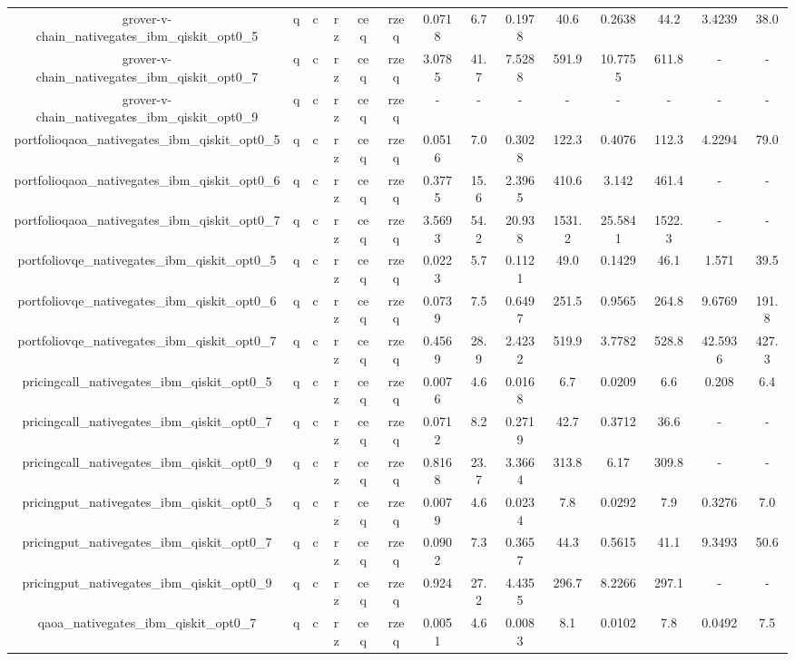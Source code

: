 \begin{table}[htb]
{\begin{tabular}{|c|c|c|c|c|c|c|c|c|c|c|c|c|c|}
grover-v-chain_nativegates_ibm_qiskit_opt0_5 & q & c & rz & ceq & rzeq & 0.0718 & 6.7 & 0.1978 & 40.6 & 0.2638 & 44.2 & 3.4239 & 38.0 \\ 
grover-v-chain_nativegates_ibm_qiskit_opt0_7 & q & c & rz & ceq & rzeq & 3.0785 & 41.7 & 7.5288 & 591.9 & 10.7755 & 611.8 & - & - \\ 
grover-v-chain_nativegates_ibm_qiskit_opt0_9 & q & c & rz & ceq & rzeq & - & - & - & - & - & - & - & - \\ 
portfolioqaoa_nativegates_ibm_qiskit_opt0_5 & q & c & rz & ceq & rzeq & 0.0516 & 7.0 & 0.3028 & 122.3 & 0.4076 & 112.3 & 4.2294 & 79.0 \\ 
portfolioqaoa_nativegates_ibm_qiskit_opt0_6 & q & c & rz & ceq & rzeq & 0.3775 & 15.6 & 2.3965 & 410.6 & 3.142 & 461.4 & - & - \\ 
portfolioqaoa_nativegates_ibm_qiskit_opt0_7 & q & c & rz & ceq & rzeq & 3.5693 & 54.2 & 20.938 & 1531.2 & 25.5841 & 1522.3 & - & - \\ 
portfoliovqe_nativegates_ibm_qiskit_opt0_5 & q & c & rz & ceq & rzeq & 0.0223 & 5.7 & 0.1121 & 49.0 & 0.1429 & 46.1 & 1.571 & 39.5 \\ 
portfoliovqe_nativegates_ibm_qiskit_opt0_6 & q & c & rz & ceq & rzeq & 0.0739 & 7.5 & 0.6497 & 251.5 & 0.9565 & 264.8 & 9.6769 & 191.8 \\ 
portfoliovqe_nativegates_ibm_qiskit_opt0_7 & q & c & rz & ceq & rzeq & 0.4569 & 28.9 & 2.4232 & 519.9 & 3.7782 & 528.8 & 42.5936 & 427.3 \\ 
pricingcall_nativegates_ibm_qiskit_opt0_5 & q & c & rz & ceq & rzeq & 0.0076 & 4.6 & 0.0168 & 6.7 & 0.0209 & 6.6 & 0.208 & 6.4 \\ 
pricingcall_nativegates_ibm_qiskit_opt0_7 & q & c & rz & ceq & rzeq & 0.0712 & 8.2 & 0.2719 & 42.7 & 0.3712 & 36.6 & - & - \\ 
pricingcall_nativegates_ibm_qiskit_opt0_9 & q & c & rz & ceq & rzeq & 0.8168 & 23.7 & 3.3664 & 313.8 & 6.17 & 309.8 & - & - \\ 
pricingput_nativegates_ibm_qiskit_opt0_5 & q & c & rz & ceq & rzeq & 0.0079 & 4.6 & 0.0234 & 7.8 & 0.0292 & 7.9 & 0.3276 & 7.0 \\ 
pricingput_nativegates_ibm_qiskit_opt0_7 & q & c & rz & ceq & rzeq & 0.0902 & 7.3 & 0.3657 & 44.3 & 0.5615 & 41.1 & 9.3493 & 50.6 \\ 
pricingput_nativegates_ibm_qiskit_opt0_9 & q & c & rz & ceq & rzeq & 0.924 & 27.2 & 4.4355 & 296.7 & 8.2266 & 297.1 & - & - \\ 
qaoa_nativegates_ibm_qiskit_opt0_7 & q & c & rz & ceq & rzeq & 0.0051 & 4.6 & 0.0083 & 8.1 & 0.0102 & 7.8 & 0.0492 & 7.5 \\ 

\end{tabular}}
\end{table}
